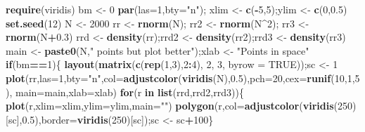 \documentclass[portrait]{article}
\newenvironment{Shaded}{\begin{snugshade}}{\end{snugshade}}
\newcommand{\KeywordTok}[1]{\textcolor[rgb]{0.13,0.29,0.53}{\textbf{#1}}}
\newcommand{\DataTypeTok}[1]{\textcolor[rgb]{0.13,0.29,0.53}{#1}}
\newcommand{\DecValTok}[1]{\textcolor[rgb]{0.00,0.00,0.81}{#1}}
\newcommand{\FloatTok}[1]{\textcolor[rgb]{0.00,0.00,0.81}{#1}}
\newcommand{\StringTok}[1]{\textcolor[rgb]{0.31,0.60,0.02}{#1}}
\newcommand{\OtherTok}[1]{\textcolor[rgb]{0.56,0.35,0.01}{#1}}
\newcommand{\ControlFlowTok}[1]{\textcolor[rgb]{0.13,0.29,0.53}{\textbf{#1}}}
\newcommand{\OperatorTok}[1]{\textcolor[rgb]{0.81,0.36,0.00}{\textbf{#1}}}
\newcommand{\NormalTok}[1]{#1}
\begin{document}
\begin{Shaded}
\begin{Highlighting}[]
\KeywordTok{require}\NormalTok{(viridis)}
\NormalTok{bm <-}\StringTok{ }\DecValTok{0}
\KeywordTok{par}\NormalTok{(}\DataTypeTok{las=}\DecValTok{1}\NormalTok{,}\DataTypeTok{bty=}\StringTok{"n"}\NormalTok{); xlim <-}\StringTok{ }\KeywordTok{c}\NormalTok{(}\OperatorTok{-}\DecValTok{5}\NormalTok{,}\DecValTok{5}\NormalTok{);ylim <-}\StringTok{ }\KeywordTok{c}\NormalTok{(}\DecValTok{0}\NormalTok{,}\FloatTok{0.5}\NormalTok{)}
\KeywordTok{set.seed}\NormalTok{(}\DecValTok{12}\NormalTok{)}
\NormalTok{N <-}\StringTok{ }\DecValTok{2000}
\NormalTok{rr <-}\StringTok{ }\KeywordTok{rnorm}\NormalTok{(N); rr2 <-}\StringTok{ }\KeywordTok{rnorm}\NormalTok{(N}\OperatorTok{^}\DecValTok{2}\NormalTok{); rr3 <-}\StringTok{ }\KeywordTok{rnorm}\NormalTok{(N}\OperatorTok{+}\FloatTok{0.3}\NormalTok{)}
\NormalTok{rrd <-}\StringTok{ }\KeywordTok{density}\NormalTok{(rr);rrd2 <-}\StringTok{ }\KeywordTok{density}\NormalTok{(rr2);rrd3 <-}\StringTok{ }\KeywordTok{density}\NormalTok{(rr3)}
\NormalTok{main <-}\StringTok{ }\KeywordTok{paste0}\NormalTok{(N,}\StringTok{" points but plot better"}\NormalTok{);xlab <-}\StringTok{ "Points in space"}
\ControlFlowTok{if}\NormalTok{(bm}\OperatorTok{==}\DecValTok{1}\NormalTok{)\{}
  \KeywordTok{layout}\NormalTok{(}\KeywordTok{matrix}\NormalTok{(}\KeywordTok{c}\NormalTok{(}\KeywordTok{rep}\NormalTok{(}\DecValTok{1}\NormalTok{,}\DecValTok{3}\NormalTok{),}\DecValTok{2}\OperatorTok{:}\DecValTok{4}\NormalTok{), }\DecValTok{2}\NormalTok{, }\DecValTok{3}\NormalTok{, }\DataTypeTok{byrow =} \OtherTok{TRUE}\NormalTok{));sc <-}\StringTok{ }\DecValTok{1}
  \KeywordTok{plot}\NormalTok{(rr,}\DataTypeTok{las=}\DecValTok{1}\NormalTok{,}\DataTypeTok{bty=}\StringTok{"n"}\NormalTok{,}\DataTypeTok{col=}\KeywordTok{adjustcolor}\NormalTok{(}\KeywordTok{viridis}\NormalTok{(N),}\FloatTok{0.5}\NormalTok{),}\DataTypeTok{pch=}\DecValTok{20}\NormalTok{,}\DataTypeTok{cex=}\KeywordTok{runif}\NormalTok{(}\DecValTok{10}\NormalTok{,}\DecValTok{1}\NormalTok{,}\DecValTok{5}\NormalTok{),}
       \DataTypeTok{main=}\NormalTok{main,}\DataTypeTok{xlab=}\NormalTok{xlab)}
\ControlFlowTok{for}\NormalTok{(r }\ControlFlowTok{in} \KeywordTok{list}\NormalTok{(rrd,rrd2,rrd3))\{}
  \KeywordTok{plot}\NormalTok{(r,}\DataTypeTok{xlim=}\NormalTok{xlim,}\DataTypeTok{ylim=}\NormalTok{ylim,}\DataTypeTok{main=}\StringTok{""}\NormalTok{)}
  \KeywordTok{polygon}\NormalTok{(r,}\DataTypeTok{col=}\KeywordTok{adjustcolor}\NormalTok{(}\KeywordTok{viridis}\NormalTok{(}\DecValTok{250}\NormalTok{)[sc],}\FloatTok{0.5}\NormalTok{),}\DataTypeTok{border=}\KeywordTok{viridis}\NormalTok{(}\DecValTok{250}\NormalTok{)[sc]);sc <-}\StringTok{ }\NormalTok{sc}\OperatorTok{+}\DecValTok{100}\NormalTok{\}}

\end{Highlighting}
\end{Shaded}
\end{document}
